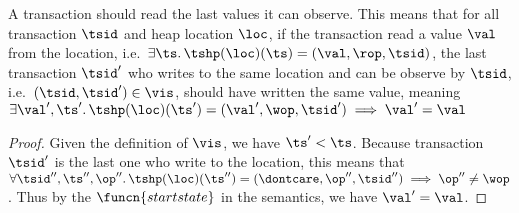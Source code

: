\begin{lem}[External]
    \label{lem:ext}
    A transaction should read the last values it can observe.
    This means that for all transaction \( \tsid \) and heap location \( \loc \), if the transaction read a value \( \val \) from the location, i.e.\ \( \exists \ts \ldotp \tshp(\loc)(\ts) = (\val, \rop, \tsid) \), the last transaction \( \tsid' \) who writes to the same location and can be observe by \( \tsid \), i.e.\ \( (\tsid, \tsid') \in \vis\), should have written the same value, meaning \( \exists \val', \ts' \ldotp \tshp(\loc)(\ts') = (\val', \wop, \tsid') \implies \val' = \val\)
\end{lem}
\begin{proof}
    Given the definition of \( \vis \), we have \( \ts' < \ts \).
    Because transaction \( \tsid' \) is the last one who write to the location, this means that \( \forall \tsid'', \ts'', \op'' \ldotp \tshp(\loc)(\ts'') = (\dontcare, \op'', \tsid'') \implies \op'' \neq \wop \).
    Thus by the \( \funcn{startstate} \) in the semantics, we have \( \val' = \val \).
\end{proof}

